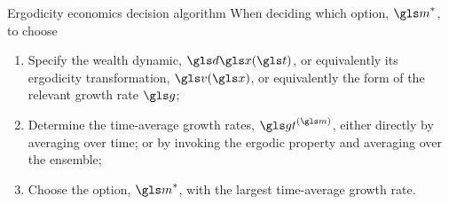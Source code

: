 \begin{keypts}{Ergodicity economics decision algorithm}
When deciding which option, $\m^*$, to choose
\begin{enumerate}
\item Specify the wealth dynamic, $\gd\x(\t)$, or equivalently its ergodicity transformation, $\gv(\x)$, or equivalently the form of the relevant growth rate $\g$;
\item Determine the time-average growth rates, $\gt^{(\m)}$, either directly by averaging over time; or by invoking the 
ergodic property and averaging over the ensemble;
\item Choose the option, $\m^*$, with the largest time-average growth rate.
\end{enumerate}
\end{keypts}


